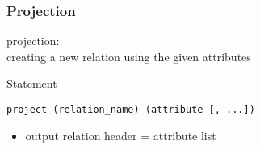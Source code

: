\documentclass[dvipsnames]{beamer}
\theoremstyle{plain}
\begin{document}
\begin{frame}[fragile]
  \frametitle{Projection}

  \begin{definition}
    \alert{projection}:\\
      creating a new relation using the given attributes
  \end{definition}

  \pause
  \begin{block}{Statement}
    \begin{lstlisting}
project (relation_name) (attribute [, ...])
    \end{lstlisting}
  \end{block}

  \pause
  \begin{itemize}
    \item output relation header = attribute list
  \end{itemize}
\end{frame}
\end{document}
